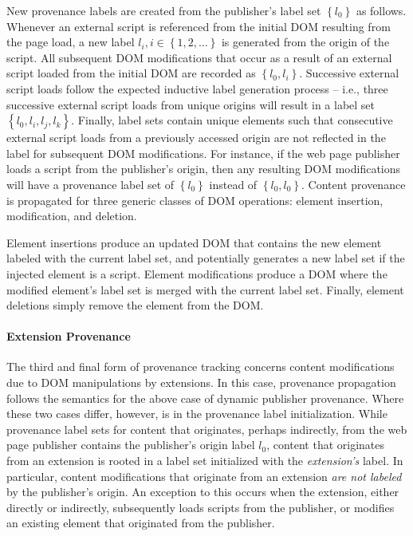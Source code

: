 New provenance labels are created from the publisher's label set
\(\left\{l_0\right\}\) as follows. Whenever an external script is referenced
from the initial DOM resulting from the page load, a new label \(l_i, i \in
\left\{1,2,\ldots\right\}\) is generated from the origin of the script. All
subsequent DOM modifications that occur as a result of an external script loaded
from the initial DOM are recorded as \(\left\{l_0,l_i\right\}\). Successive
external script loads follow the expected inductive label generation process --
i.e., three successive external script loads from unique origins will result in
a label set \(\left\{l_0,l_i,l_j,l_k\right\}\). Finally, label sets contain
unique elements such that consecutive external script loads from a previously
accessed origin are not reflected in the label for subsequent DOM modifications.
For instance, if the web page publisher loads a script from the publisher's
origin, then any resulting DOM modifications will have a provenance label set of
\(\left\{l_0\right\}\) instead of \(\left\{l_0,l_0\right\}\). Content provenance
is propagated for three generic classes of DOM operations: element insertion,
modification, and deletion.

Element insertions produce an updated DOM that contains the new element labeled
with the current label set, and potentially generates a new label set if the
injected element is a script. Element modifications produce a DOM where the
modified element's label set is merged with the current label set. Finally,
element deletions simply remove the element from the DOM.

\paragraph{Extension Provenance}

The third and final form of provenance tracking concerns content modifications
due to DOM manipulations by extensions. In this case, provenance propagation
follows the semantics for the above case of dynamic publisher provenance. Where
these two cases differ, however, is in the provenance label initialization.
While provenance label sets for content that originates, perhaps indirectly,
from the web page publisher contains the publisher's origin label \(l_0\),
content that originates from an extension is rooted in a label set initialized
with the \emph{extension's} label. In particular, content modifications that
originate from an extension \emph{are not labeled} by the publisher's origin. An
exception to this occurs when the extension, either directly or indirectly,
subsequently loads scripts from the publisher, or modifies an existing element
that originated from the publisher.

